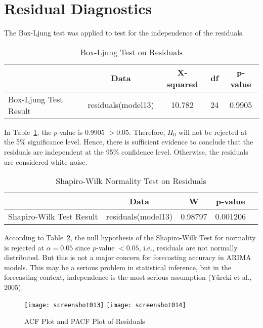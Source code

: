 \documentclass[12pt,a4paper]{report} %
\begin{document}
	
	\section{Residual Diagnostics}
	
	The Box-Ljung test was applied to test for the independence of the residuals.
	
	
	\begin{table}[h!]
		\centering
		\caption{Box-Ljung Test on Residuals}
		\label{tab:res}
		\begin{tabular}{l c c c c}
			\toprule
			& \textbf{Data} & \textbf{X-squared} & \textbf{df} & \textbf{p-value} \\
			\midrule
			Box-Ljung Test Result & residuals(model13) & 10.782 & 24 & 0.9905 \\
			\bottomrule
		\end{tabular}
	\end{table}
	
	
	In Table~\ref{tab:res}, the $p$-value is 0.9905 $> 0.05$. Therefore, $H_0$ will not be rejected at the 5\% significance level. Hence, there is sufficient evidence to conclude that the residuals are independent at the 95\% confidence level. Otherwise, the residuals are considered white noise.
	
	
	\begin{table}[h!]
		\centering
		\caption{Shapiro-Wilk Normality Test on Residuals}
		\label{tab:normality}
		\begin{tabular}{l c c c c}
			\toprule
			& \textbf{Data} & \textbf{W} & \textbf{p-value} \\
			\midrule
			Shapiro-Wilk Test Result & residuals(model13) & 0.98797 & 0.001206 \\
			\bottomrule
		\end{tabular}
	\end{table}
	
	According to Table~\ref{tab:normality}, the null hypothesis of the Shapiro-Wilk Test for normality is rejected at $\alpha = 0.05$ since $p$-value $< 0.05$, i.e., residuals are not normally distributed. But this is not a major concern for forecasting accuracy in ARIMA models. This may be a serious problem in statistical inference, but in the forecasting context, independence is the most serious assumption (Yüreki et al., 2005).
	
	\begin{figure}[h!]
		\centering
		\texttt{[image: screenshot013]}
		\texttt{[image: screenshot014]}
		\caption{ACF Plot and PACF Plot of Residuals}
		\label{fig:screenshot014}
	\end{figure}
	
\end{document}
